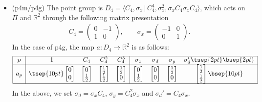 \documentclass[pdftex]{sigma}
\theoremstyle{definition}
\newcommand{\R}{\mathbb{R}}
\begin{document}
\begin{itemize}
\item
(\textsf{p4m/p4g})
The point group is $D_4 = \langle C_4, \sigma_x \,|\, C_4^4, \sigma_x^2, \sigma_xC_4\sigma_xC_4 \rangle$, which acts on $\Pi$ and $\R^2$ through the following matrix presentation
\begin{gather*}
C_4 =
\left(
\begin{matrix}
0 & -1\\
1 & 0
\end{matrix}
\right), \qquad
\sigma_x =
\left(
\begin{matrix}
-1 & 0\\
0 & 1
\end{matrix}
\right).
\end{gather*}
In the case of \textsf{p4g}, the map $a \colon D_4 \to \R^2$ is as follows:
$$
\begin{array}{|c|cccc|cccc|}
\hline
p &
1 & C_4 & C_4^2 & C_4^3 & \sigma_x & \sigma_d & \sigma_y & \sigma_d'\tsep{2pt}\bsep{2pt}\\
\hline
a_p &
\tsep{10pt}\left[
\begin{matrix}
0 \\ 0
\end{matrix}
\right]
&
\left[
\begin{matrix}
0 \\ \frac{1}{2}
\end{matrix}
\right]
&
\left[
\begin{matrix}
\frac{1}{2} \\ \frac{1}{2}
\end{matrix}
\right]
&
\left[
\begin{matrix}
\frac{1}{2} \\ 0
\end{matrix}
\right]
&
\left[
\begin{matrix}
0 \\ \frac{1}{2}
\end{matrix}
\right]
&
\left[
\begin{matrix}
0 \\ 0
\end{matrix}
\right]
&
\left[
\begin{matrix}
\frac{1}{2} \\ 0
\end{matrix}
\right]
&
\left[
\begin{matrix}
\frac{1}{2} \vspace{1mm}\\ \frac{1}{2}
\end{matrix}
\right] \bsep{10pt}\\
\hline
\end{array}
$$
In the above, we set $\sigma_d = \sigma_xC_4$, $\sigma_y = C_4^2\sigma_x$ and $\sigma_d' = C_4\sigma_x$.
\end{itemize}
\end{document}
